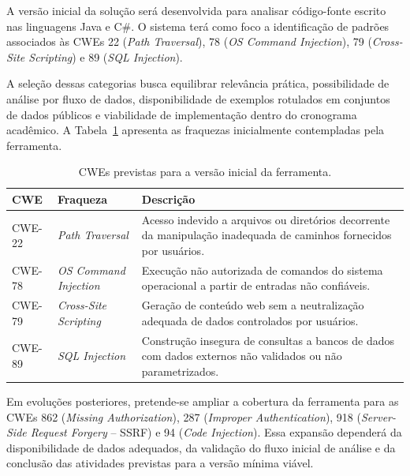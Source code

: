 A versão inicial da solução será desenvolvida para analisar código-fonte
escrito nas linguagens Java e C\#. O sistema terá como foco a identificação
de padrões associados às CWEs 22 (\textit{Path Traversal}), 78
(\textit{OS Command Injection}), 79 (\textit{Cross-Site Scripting}) e 89
(\textit{SQL Injection}).

A seleção dessas categorias busca equilibrar relevância prática,
possibilidade de análise por fluxo de dados, disponibilidade de exemplos
rotulados em conjuntos de dados públicos e viabilidade de implementação
dentro do cronograma acadêmico. A Tabela~\ref{tab:cwes_escopo} apresenta as
fraquezas inicialmente contempladas pela ferramenta.

\begin{table}[H]
    \centering
    \caption{CWEs previstas para a versão inicial da ferramenta.}
    \label{tab:cwes_escopo}
    \footnotesize
    \begin{tabular}{p{1.4cm}p{4.0cm}p{7.5cm}}
        \toprule
        \textbf{CWE} & \textbf{Fraqueza} & \textbf{Descrição} \\
        \midrule
        CWE-22 &
        \textit{Path Traversal} &
        Acesso indevido a arquivos ou diretórios decorrente da manipulação
        inadequada de caminhos fornecidos por usuários. \\

        CWE-78 &
        \textit{OS Command Injection} &
        Execução não autorizada de comandos do sistema operacional a partir
        de entradas não confiáveis. \\

        CWE-79 &
        \textit{Cross-Site Scripting} &
        Geração de conteúdo web sem a neutralização adequada de dados
        controlados por usuários. \\

        CWE-89 &
        \textit{SQL Injection} &
        Construção insegura de consultas a bancos de dados com dados
        externos não validados ou não parametrizados. \\
        \bottomrule
    \end{tabular}
    \normalsize
\end{table}

Em evoluções posteriores, pretende-se ampliar a cobertura da ferramenta
para as CWEs 862 (\textit{Missing Authorization}), 287 (\textit{Improper
Authentication}), 918 (\textit{Server-Side Request Forgery} -- SSRF) e 94
(\textit{Code Injection}). Essa expansão dependerá da disponibilidade de
dados adequados, da validação do fluxo inicial de análise e da conclusão
das atividades previstas para a versão mínima viável.

